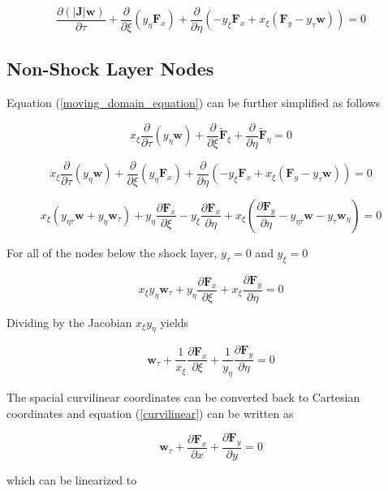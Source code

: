 \documentclass[10pt]{article}
\begin{document}
	 \begin{equation} \label{moving_domain_equation}
	 	\frac{\partial (|\mathbf{J}| \mathbf{w})}{\partial \tau} 
	 	+ \frac{\partial}{\partial \xi} (y_\eta \mathbf{F}_x) 
	 	+ \frac{\partial}{\partial \eta} (-y_\xi \mathbf{F}_x + x_\xi (\mathbf{F}_y - y_\tau \mathbf{w})) 
	 	= 0
	 \end{equation} 
	 
	 \subsection{Non-Shock Layer Nodes}
	 
	 Equation (\ref{moving_domain_equation}) can be further simplified as follows
	 
	 $$ x_\xi \frac{\partial}{\partial \tau} \left( y_\eta \mathbf{w} \right) + \frac{\partial}{\partial \xi} \tilde{\mathbf{F}}_\xi + \frac{\partial}{\partial \eta} \tilde{\mathbf{F}}_\eta = 0 $$
	 
	 $$ x_\xi \frac{\partial}{\partial \tau} \left( y_\eta \mathbf{w} \right) + \frac{\partial}{\partial \xi} (y_\eta \mathbf{F}_x) + \frac{\partial}{\partial \eta} (-y_\xi \mathbf{F}_x + x_\xi (\mathbf{F}_y - y_\tau \mathbf{w})) = 0$$
	 
	 $$ x_\xi (y_{\eta \tau} \mathbf{w} + y_\eta \mathbf{w}_\tau) + y_\eta \frac{\partial \mathbf{F}_x}{\partial \xi} - y_\xi \frac{\partial \mathbf{F}_x}{\partial \eta} + x_\xi \left(\frac{\partial \mathbf{F}_y}{\partial \eta} - y_{\eta \tau} \mathbf{w} - y_\tau \mathbf{w}_\eta \right) = 0$$
	 
	 For all of the nodes below the shock layer, $y_{\tau} = 0$ and $y_{\xi} = 0$
	 
	 $$ x_\xi y_\eta \mathbf{w}_\tau + y_\eta \frac{\partial \mathbf{F}_x}{\partial \xi} + x_\xi \frac{\partial \mathbf{F}_y}{\partial \eta} = 0 $$
	 
	 Dividing by the Jacobian $x_\xi y_\eta$ yields
	 
	 $$ \mathbf{w}_\tau + \frac{1}{x_\xi} \frac{\partial \mathbf{F}_x}{\partial \xi} + \frac{1}{y_\eta} \frac{\partial \mathbf{F}_y}{\partial \eta} = 0 $$
	 
	 The spacial curvilinear coordinates can be converted back to Cartesian coordinates and equation (\ref{curvilinear}) can be written as
	 
	 $$	\mathbf{w}_\tau + \frac{\partial \mathbf{F}_x}{\partial x} + \frac{\partial \mathbf{F}_y}{\partial y} = 0 $$
	
	which can be linearized to
	
\end{document}
